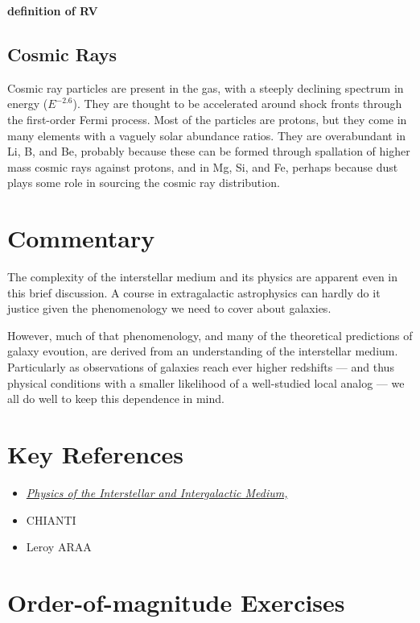 {\bf definition of RV}

\subsection{Cosmic Rays}

Cosmic ray particles are present in the gas, with a steeply declining
spectrum in energy ($E^{-2.6}$). They are thought to be accelerated
around shock fronts through the first-order Fermi process. Most of the
particles are protons, but they come in many elements with a vaguely
solar abundance ratios. They are overabundant in Li, B, and Be,
probably because these can be formed through spallation of higher mass
cosmic rays against protons, and in Mg, Si, and Fe, perhaps because
dust plays some role in sourcing the cosmic ray distribution.

\section{Commentary}

The complexity of the interstellar medium and its physics are apparent
even in this brief discussion. A course in extragalactic astrophysics
can hardly do it justice given the phenomenology we need to cover
about galaxies. 

However, much of that phenomenology, and many of the theoretical
predictions of galaxy evoution, are derived from an understanding of
the interstellar medium. Particularly as observations of galaxies
reach ever higher redshifts --- and thus physical conditions with a
smaller likelihood of a well-studied local analog --- we all do well
to keep this dependence in mind.

\section{Key References}

\begin{itemize}
  \item
    \href{http://}
    {\it Physics of the Interstellar and Intergalactic Medium,
      \citet{draine07a}}
\item CHIANTI
\item Leroy ARAA
\end{itemize}

      \citet{gunn06a}

\section{Order-of-magnitude Exercises}

